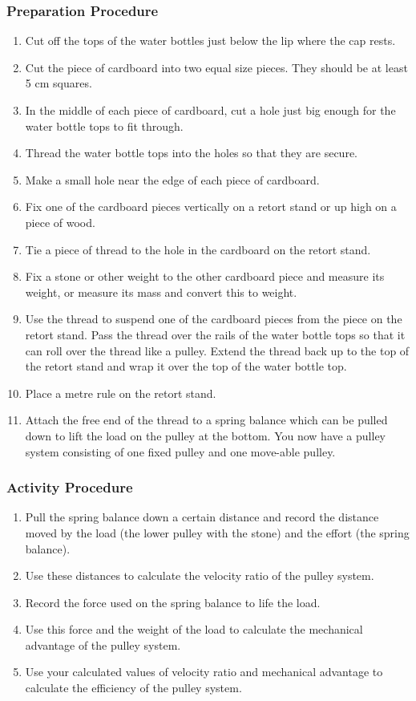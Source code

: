 \subsubsection*{Preparation Procedure}
\begin{enumerate}
\item{Cut off the tops of the water bottles just below the lip where the cap rests.}
\item{Cut the piece of cardboard into two equal size pieces.  They should be at least 5 cm squares.}
\item{In the middle of each piece of cardboard, cut a hole just big enough for the water bottle tops to fit through.}
\item{Thread the water bottle tops into the holes so that they are secure.}
\item{Make a small hole near the edge of each piece of cardboard.}
\item{Fix one of the cardboard pieces vertically on a retort stand or up high on a piece of wood.}
\item{Tie a piece of thread to the hole in the cardboard on the retort stand.}
\item{Fix a stone or other weight to the other cardboard piece and measure its weight, or measure its mass and convert this to weight.}
\item{Use the thread to suspend one of the cardboard pieces from the piece on the retort stand.  Pass the thread over the rails of the water bottle tops so that it can roll over the thread like a pulley.  Extend the thread back up to the top of the retort stand and wrap it over the top of the water bottle top.}
\item{Place a metre rule on the retort stand.}
\item{Attach the free end of the thread to a spring balance which can be pulled down to lift the load on the pulley at the bottom.  You now have a pulley system consisting of one fixed pulley and one move-able pulley.}
\end{enumerate}

\subsubsection*{Activity Procedure}
\begin{enumerate}
\item{Pull the spring balance down a certain distance and record the distance moved by the load (the lower pulley with the stone) and the effort (the spring balance).}
\item{Use these distances to calculate the velocity ratio of the pulley system.}
\item{Record the force used on the spring balance to life the load.}
\item{Use this force and the weight of the load to calculate the mechanical advantage of the pulley system.}
\item{Use your calculated values of velocity ratio and mechanical advantage to calculate the efficiency of the pulley system.}
\end{enumerate}

